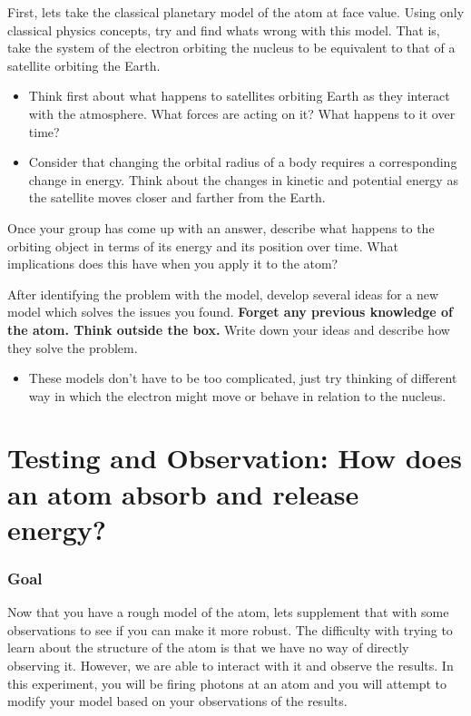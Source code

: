 \begin{steps} 
	\item First, lets take the classical planetary model of the atom at face value. Using only classical physics concepts, try and find whats wrong with this model. That is, take the system of the electron orbiting the nucleus to be equivalent to that of a satellite orbiting the Earth. 
	\begin{itemize} 
		\item Think first about what happens to satellites orbiting Earth as they interact with the atmosphere. What forces are acting on it? What happens to it over time?
		
		\item Consider that changing the orbital radius of a body requires a corresponding change in energy. Think about the changes in kinetic and potential energy as the satellite moves closer and farther from the Earth. 
	\end{itemize}
	\item Once your group has come up with an answer, describe what happens to the orbiting object in terms of its energy and its position over time. What implications does this have when you apply it to the atom?
	
	\item After identifying the problem with the model, develop several ideas for a new model which solves the issues you found. \textbf{Forget any previous knowledge of the atom. Think outside the box.} Write down your ideas and describe how they solve the problem. 
	\begin{itemize}
		\item These models don't have to be too complicated, just try thinking of different way in which the electron might move or behave in relation to the nucleus.
	\end{itemize} 
\end{steps}

\section{Testing and Observation: How does an atom absorb and release energy?} 
\subsubsection{Goal}
Now that you have a rough model of the atom, lets supplement that with some observations to see if you can make it more robust. The difficulty with trying to learn about the structure of the atom is that we have no way of directly observing it. However, we are able to interact with it and observe the results. In this experiment, you will be firing photons at an atom and you will attempt to modify your model based on your observations of the results. 
